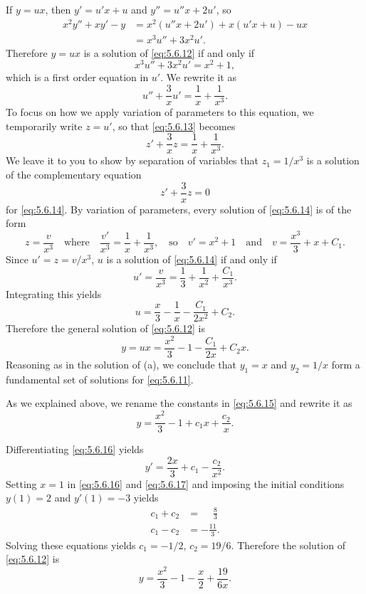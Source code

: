 \begin{alistSolution}
\item If $y=ux$, then $y'=u'x+u$ and $y''=u''x+2u'$, so
\begin{align*}
x^2y''+xy'-y&=x^2(u''x+2u')+x(u'x+u)-ux\\
&=x^3u''+3x^2u'.
\end{align*}
Therefore $y=ux$ is a solution of \eqref{eq:5.6.12} if and only if
\[
x^3u''+3x^2u'=x^2+1,
\]
which is a first order equation in $u'$.
We rewrite it as
\begin{equation} \label{eq:5.6.13}
u''+\frac{3}{x}u'=\frac{1}{x}+\frac{1}{x^3}.
\end{equation}
To focus on how we apply variation of parameters to this equation, we
temporarily write $z=u'$, so that \eqref{eq:5.6.13} becomes
\begin{equation} \label{eq:5.6.14}
z'+\frac{3}{x}z=\frac{1}{x}+\frac{1}{x^3}.
\end{equation}
We leave it to you to show by separation of variables that
$z_1=1/x^3$ is a solution of the complementary equation
\[
z'+\frac{3}{x}z=0
\]
for \eqref{eq:5.6.14}. By variation of parameters, every solution of
\eqref{eq:5.6.14} is of the form
\[
z=\frac{v}{x^3}\quad\text{where}\quad
\frac{v'}{x^3}=\frac{1}{x}+\frac{1}{x^3}, \quad\text{so}\quad
 v'=x^2+1 \quad\text{and}\quad
 v=\frac{x^3}{3}+x+C_1.
\]
Since $u'=z=v/x^3$,   $u$ is a solution of \eqref{eq:5.6.14} if and only
if
\[
u'=\frac{v}{x^3}=\frac{1}{3}+\frac{1}{x^2}+\frac{C_1}{x^3}.
\]
Integrating this yields
\[
u=\frac{x}{3}-\frac{1}{x}-\frac{C_1}{2x^2}+C_2.
\]
Therefore the general solution of  \eqref{eq:5.6.12} is
\begin{equation} \label{eq:5.6.15}
y=ux=\frac{x^2}{3}-1-\frac{C_1}{2x}+C_2x.
\end{equation}
Reasoning as in  the solution of
(a), we  conclude that $y_1=x$ and $y_2=1/x$
form a fundamental set of solutions for \eqref{eq:5.6.11}.

As we explained above, we rename the constants in \eqref{eq:5.6.15} and
rewrite it as
\begin{equation}  \label{eq:5.6.16}
y=\frac{x^2}{3}-1+c_1x+\frac{c_2}{x}.
\end{equation}

\item Differentiating  \eqref{eq:5.6.16} yields
\begin{equation} \label{eq:5.6.17}
y'=\frac{2x}{3}+c_1-\frac{c_2}{x^2}.
\end{equation}
 Setting $x=1$ in  \eqref{eq:5.6.16} and  \eqref{eq:5.6.17} and imposing the
initial conditions $y(1)=2$ and $y'(1)=-3$  yields
\begin{align*}
c_1+c_2&= \phantom{-}\frac{8}{3} \\
c_1-c_2&= -\frac{11}{3}.
\end{align*}
Solving these  equations yields $c_1=-1/2$, $c_2=19/6$.
Therefore the solution of \eqref{eq:5.6.12} is
\[
y=\frac{x^2}{3}-1-\frac{x}{2}+\frac{19}{6x}.
\]
\end{alistSolution}


